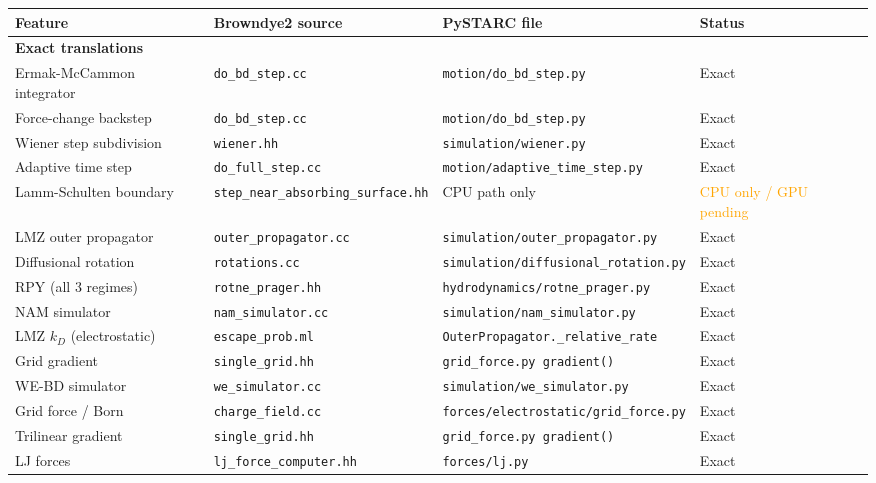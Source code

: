 \documentclass[12pt,a4paper]{article}
\begin{document}
\begin{longtable}{p{5cm}p{3.5cm}p{3.5cm}p{1.8cm}}
\toprule
Feature & Browndye2 source & PySTARC file & Status\\
\midrule\endhead
\multicolumn{4}{l}{\textbf{Exact translations}}\\[2pt]
Ermak-McCammon integrator & \texttt{do\_bd\_step.cc} & \texttt{motion/do\_bd\_step.py} & \textcolor{cgreen}{Exact}\\
Force-change backstep & \texttt{do\_bd\_step.cc} & \texttt{motion/do\_bd\_step.py} & \textcolor{cgreen}{Exact}\\
Wiener step subdivision & \texttt{wiener.hh} & \texttt{simulation/wiener.py} & \textcolor{cgreen}{Exact}\\
Adaptive time step & \texttt{do\_full\_step.cc} & \texttt{motion/adaptive\_time\_step.py} & \textcolor{cgreen}{Exact}\\
Lamm-Schulten boundary & \texttt{step\_near\_absorbing\_surface.hh} & CPU path only & \textcolor{orange}{CPU only / GPU pending}\\
LMZ outer propagator & \texttt{outer\_propagator.cc} & \texttt{simulation/outer\_propagator.py} & \textcolor{cgreen}{Exact}\\
Diffusional rotation & \texttt{rotations.cc} & \texttt{simulation/diffusional\_rotation.py} & \textcolor{cgreen}{Exact}\\
RPY (all 3 regimes) & \texttt{rotne\_prager.hh} & \texttt{hydrodynamics/rotne\_prager.py} & \textcolor{cgreen}{Exact}\\
NAM simulator & \texttt{nam\_simulator.cc} & \texttt{simulation/nam\_simulator.py} & \textcolor{cgreen}{Exact}\\
LMZ $k_D$ (electrostatic) & \texttt{escape\_prob.ml} & \texttt{OuterPropagator.\_relative\_rate} & \textcolor{cgreen}{Exact}\\
Grid gradient & \texttt{single\_grid.hh} & \texttt{grid\_force.py gradient()} & \textcolor{cgreen}{Exact}\\
WE-BD simulator & \texttt{we\_simulator.cc} & \texttt{simulation/we\_simulator.py} & \textcolor{cgreen}{Exact}\\
Grid force / Born & \texttt{charge\_field.cc} & \texttt{forces/electrostatic/grid\_force.py} & \textcolor{cgreen}{Exact}\\
Trilinear gradient & \texttt{single\_grid.hh} & \texttt{grid\_force.py gradient()} & \textcolor{cgreen}{Exact}\\
LJ forces & \texttt{lj\_force\_computer.hh} & \texttt{forces/lj.py} & \textcolor{cgreen}{Exact}\\

\end{longtable}
\end{document}
